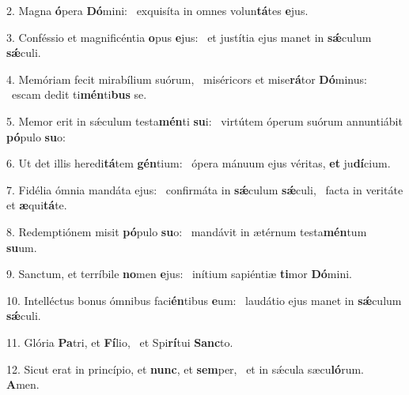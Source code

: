 2. Magna \textbf{ó}pera \textbf{Dó}mini: \ast\  exquisíta in omnes volun\textbf{tá}tes \textbf{e}jus.\

3. Conféssio et magnificéntia \textbf{o}pus \textbf{e}jus: \ast\  et justítia ejus manet in \textbf{sǽ}culum \textbf{sǽ}culi.\

4. Memóriam fecit mirabílium suórum, \dag\  miséricors et mise\textbf{rá}tor \textbf{Dó}minus: \ast\  escam dedit ti\textbf{mén}ti\textbf{bus} se.\

5. Memor erit in sǽculum testa\textbf{mén}ti \textbf{su}i: \ast\  virtútem óperum suórum annuntiábit \textbf{pó}pulo \textbf{su}o:\

6. Ut det illis heredi\textbf{tá}tem \textbf{gén}tium: \ast\  ópera mánuum ejus véritas, \textbf{et} ju\textbf{dí}cium.\

7. Fidélia ómnia mandáta ejus: \dag\  confirmáta in \textbf{sǽ}culum \textbf{sǽ}culi, \ast\  facta in veritáte et \textbf{æ}qui\textbf{tá}te.\

8. Redemptiónem misit \textbf{pó}pulo \textbf{su}o: \ast\  mandávit in ætérnum testa\textbf{mén}tum \textbf{su}um.\

9. Sanctum, et terríbile \textbf{no}men \textbf{e}jus: \ast\  inítium sapiéntiæ \textbf{ti}mor \textbf{Dó}mini.\

10. Intelléctus bonus ómnibus faci\textbf{én}tibus \textbf{e}um: \ast\  laudátio ejus manet in \textbf{sǽ}culum \textbf{sǽ}culi.\

11. Glória \textbf{Pa}tri, et \textbf{Fí}lio, \ast\  et Spi\textbf{rí}tui \textbf{Sanc}to.\

12. Sicut erat in princípio, et \textbf{nunc}, et \textbf{sem}per, \ast\  et in sǽcula sæcu\textbf{ló}rum. \textbf{A}men.\

